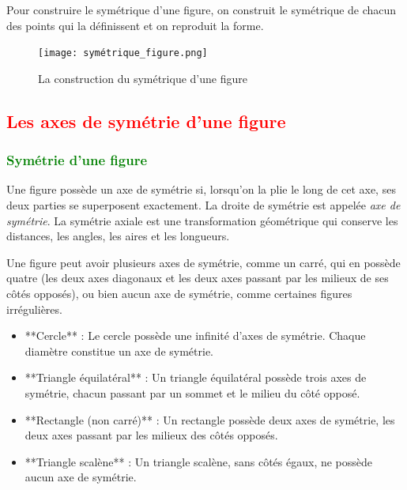 \documentclass{article}
\begin{document}
\vspace{0.2cm}

Pour construire le symétrique d'une figure, on construit le symétrique de chacun des points qui la définissent et on reproduit la forme.

\begin{figure}[H]
    \centering
    \texttt{[image: symétrique\_figure.png]}
    \caption{La construction du symétrique d'une figure}
    \label{fig:enter-label}
\end{figure}

\subsection{\textcolor{red}{Les axes de symétrie d'une figure}}

\subsubsection{\textcolor{green}{Symétrie d'une figure}}

\vspace{0.2cm}

\begin{tcolorbox}[colback=red!10!white, colframe=red!75!black, title=\textcolor{white}{Définition : Symétrie d'une figure}, sharp corners=south]
    Une figure possède un axe de symétrie si, lorsqu'on la plie le long de cet axe, ses deux parties se superposent exactement. La droite de symétrie est appelée \textit{axe de symétrie}. 
    La symétrie axiale est une transformation géométrique qui conserve les distances, les angles, les aires et les longueurs.
\end{tcolorbox}

\vspace{0.35cm}

Une figure peut avoir plusieurs axes de symétrie, comme un carré, qui en possède quatre (les deux axes diagonaux et les deux axes passant par les milieux de ses côtés opposés), ou bien aucun axe de symétrie, comme certaines figures irrégulières. 

\begin{itemize}
    \item **Cercle** : Le cercle possède une infinité d'axes de symétrie. Chaque diamètre constitue un axe de symétrie.
    \item **Triangle équilatéral** : Un triangle équilatéral possède trois axes de symétrie, chacun passant par un sommet et le milieu du côté opposé.
    \item **Rectangle (non carré)** : Un rectangle possède deux axes de symétrie, les deux axes passant par les milieux des côtés opposés.
    \item **Triangle scalène** : Un triangle scalène, sans côtés égaux, ne possède aucun axe de symétrie.
\end{itemize}
\end{document}
